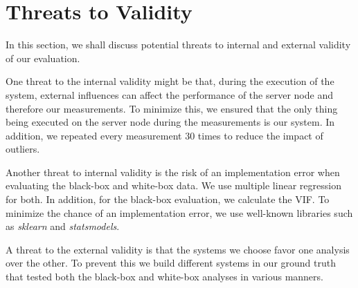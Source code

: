 \section{Threats to Validity}\label{sec:threats}

In this section, we shall discuss potential threats to internal and external validity of our evaluation.

One threat to the internal validity might be that, during the execution of the system, 
external influences can affect the performance of the server node and therefore our measurements. 
To minimize this, we ensured that the only thing being executed on the server node during the measurements is our system. 
In addition, we repeated every measurement $30$ times to reduce the impact of outliers.  

Another threat to internal validity is the risk of an implementation error when evaluating the black-box and white-box data.
We use multiple linear regression for both. In addition, for the black-box evaluation, we calculate the VIF.
To minimize the chance of an implementation error, we use well-known libraries such as \emph{sklearn} and \emph{statsmodels}.

A threat to the external validity is that the systems we choose favor one analysis over the other. 
To prevent this we build different systems in our ground truth that tested both the black-box and white-box analyses 
in various manners.